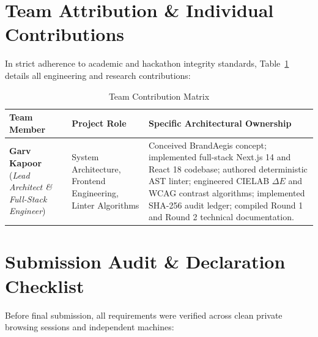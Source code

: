 \documentclass[10pt,a4paper]{article}
\begin{document}
\vspace{-0.25cm}
\section{Team Attribution \& Individual Contributions}
In strict adherence to academic and hackathon integrity standards, Table~\ref{tab:team} details all engineering and research contributions:

\begin{table}[h]
\centering
\footnotesize
\caption{Team Contribution Matrix}\label{tab:team}
\begin{tabularx}{\textwidth}{p{3.0cm}p{3.4cm}X}
\toprule
\textbf{Team Member} & \textbf{Project Role} & \textbf{Specific Architectural Ownership} \\
\midrule
\textbf{Garv Kapoor} \newline (\textit{Lead Architect \& Full-Stack Engineer}) & System Architecture, Frontend Engineering, Linter Algorithms & Conceived BrandAegis concept; implemented full-stack Next.js 14 and React 18 codebase; authored deterministic AST linter; engineered CIELAB $\Delta E$ and WCAG contrast algorithms; implemented SHA-256 audit ledger; compiled Round 1 and Round 2 technical documentation. \\
\bottomrule
\end{tabularx}
\end{table}

\vspace{-0.25cm}
\section{Submission Audit \& Declaration Checklist}
Before final submission, all requirements were verified across clean private browsing sessions and independent machines:
\end{document}
